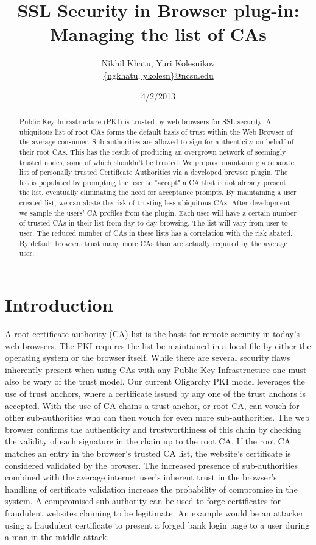 \documentclass[10pt,twocolumn,pdftex]{article}
\title{SSL Security in Browser plug-in: Managing the list of CAs}
\author{Nikhil Khatu, Yuri Kolesnikov \\
\url{{ngkhatu, ykolesn}@ncsu.edu}}
\date{4/2/2013}
\begin{document}
\maketitle
\begin{abstract}
Public Key Infrastructure (PKI) is trusted by web browsers for SSL security. A ubiquitous list of root CAs forms the default basis of trust within the Web Browser of the average consumer. Sub-authorities are allowed to sign for authenticity on behalf of their root CAs.  This has the result of producing an overgrown network of seemingly trusted nodes, some of which shouldn't be trusted. We propose maintaining a separate list of personally trusted Certificate Authorities via a developed browser plugin.  The list is populated by prompting the user to "accept" a CA that is not already present the list, eventually eliminating the need for acceptance prompts. By maintaining a user created list, we can abate the risk of trusting less ubiquitous CAs. After development we sample the users' CA profiles from the plugin. Each user will have a certain number of trusted CAs in their list from day to day browsing. The list will vary from user to user. The reduced number of CAs in these lists has a correlation with the risk abated. By default browsers trust many more CAs than are actually required by the average user.
\end{abstract}

\section{Introduction}
A root certificate authority (CA) list is the basis for remote security in today's web browsers.  The PKI requires the list be maintained in a local file by either the operating system or the browser itself. While there are several security flaws inherently present when using CAs with any Public Key Infrastructure one must also be wary of the trust model.\cite{ellison2000ten} Our current Oligarchy PKI model leverages the use of trust anchors, where a certificate issued by any one of the trust anchors is accepted.\cite{kaufman2002network} With the use of CA chains a trust anchor, or root CA, can vouch for other sub-authorities who can then vouch for even more sub-authorities. The web browser confirms the authenticity and trustworthiness of this chain by checking the validity of each signature in the chain up to the root CA.  If the root CA matches an entry in the browser’s trusted CA list, the website’s certificate is considered validated by the browser.  The increased presence of sub-authorities combined with the average internet user's inherent trust in the browser's handling of certificate validation increase the probability of compromise in the system. A compromised sub-authority can be used to forge certificates for fraudulent websites claiming to be legitimate.  An example would be an attacker using a fraudulent certificate to present a forged bank login page to a user during a man in the middle attack. 
\end{document}
